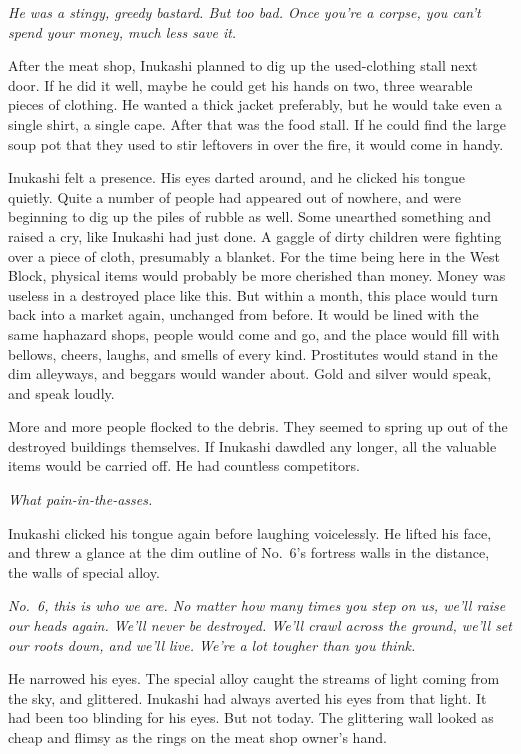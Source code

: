 \emph{He was a stingy, greedy bastard. But too bad. Once you're a corpse, you
can't spend your money, much less save it.}

After the meat shop, Inukashi planned to dig up the used-clothing stall
next door. If he did it well, maybe he could get his hands on two, three
wearable pieces of clothing. He wanted a thick jacket preferably, but he
would take even a single shirt, a single cape. After that was the food
stall. If he could find the large soup pot that they used to stir
leftovers in over the fire, it would come in handy.

Inukashi felt a presence. His eyes darted around, and he clicked his
tongue quietly. Quite a number of people had appeared out of nowhere,
and were beginning to dig up the piles of rubble as well. Some unearthed
something and raised a cry, like Inukashi had just done. A gaggle of
dirty children were fighting over a piece of cloth, presumably a
blanket. For the time being here in the West Block, physical items would
probably be more cherished than money. Money was useless in a destroyed
place like this. But within a month, this place would turn back into a
market again, unchanged from before. It would be lined with the same
haphazard shops, people would come and go, and the place would fill with
bellows, cheers, laughs, and smells of every kind. Prostitutes would
stand in the dim alleyways, and beggars would wander about. Gold and
silver would speak, and speak loudly.

More and more people flocked to the debris. They seemed to spring up out
of the destroyed buildings themselves. If Inukashi dawdled any longer,
all the valuable items would be carried off. He had countless
competitors.

\emph{What pain-in-the-asses.}

Inukashi clicked his tongue again before laughing voicelessly. He lifted
his face, and threw a glance at the dim outline of No.~6's fortress
walls in the distance, the walls of special alloy.

\emph{No.~6, this is who we are. No matter how many times you step on us,
we'll raise our heads again. We'll never be destroyed. We'll crawl
across the ground, we'll set our roots down, and we'll live. We're a lot
tougher than you think.}

He narrowed his eyes. The special alloy caught the streams of light
coming from the sky, and glittered. Inukashi had always averted his eyes
from that light. It had been too blinding for his eyes. But not today.
The glittering wall looked as cheap and flimsy as the rings on the meat
shop owner's hand.

